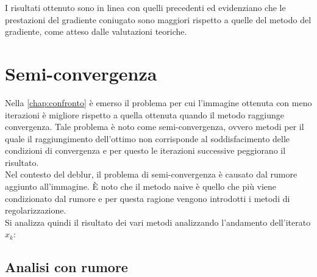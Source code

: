 \documentclass[11pt]{article}
\begin{document}
I risultati ottenuto sono in linea con quelli precedenti ed evidenziano che le prestazioni del gradiente coniugato sono maggiori rispetto a quelle del metodo del gradiente, come atteso dalle valutazioni teoriche.

\section{Semi-convergenza}
\label{chap:semiconv}
Nella \autoref{chap:confronto} è emerso il problema per cui l'immagine ottenuta con meno iterazioni è migliore rispetto a quella ottenuta quando il metodo raggiunge convergenza. 
Tale problema è noto come semi-convergenza, ovvero metodi per il quale il raggiungimento dell'ottimo non corrisponde al soddisfacimento delle condizioni di convergenza 
e per questo le iterazioni successive peggiorano il risultato.\\
Nel contesto del deblur, il problema di semi-convergenza è causato dal rumore aggiunto all'immagine. È noto che il metodo naive è quello che più viene condizionato dal rumore e per questa ragione vengono introdotti i metodi di regolarizzazione.\\
Si analizza quindi il risultato dei vari metodi analizzando l'andamento dell'iterato $x_{k}$:

\subsection{Analisi con rumore}
\end{document}
